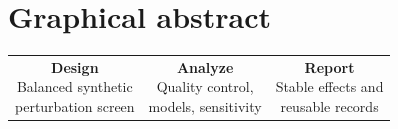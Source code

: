\section{Graphical abstract}
\begin{center}
\setlength{\fboxsep}{8pt}
\begin{tabular}{c@{\quad$\Longrightarrow$\quad}c@{\quad$\Longrightarrow$\quad}c}
\fcolorbox{CellRed}{CellLight}{\parbox[c][2.5cm][c]{0.23\textwidth}{\centering
\textbf{Design}\\[3pt]Balanced synthetic\\perturbation screen}}
&
\fcolorbox{CellRed}{CellLight}{\parbox[c][2.5cm][c]{0.23\textwidth}{\centering
\textbf{Analyze}\\[3pt]Quality control,\\models, sensitivity}}
&
\fcolorbox{CellRed}{CellLight}{\parbox[c][2.5cm][c]{0.23\textwidth}{\centering
\textbf{Report}\\[3pt]Stable effects and\\reusable records}}
\end{tabular}
\end{center}

